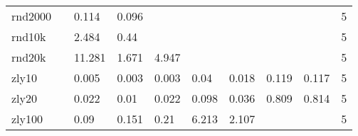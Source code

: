 \begin{landscape}
\begin{table}[h]
\begin{tabular}{llllllllll}
			rnd2000 &       & 0.114  & 0.096   &          &            &            &          &         & 5     \\
			rnd10k  &       & 2.484  & 0.44    &          &            &            &          &         & 5     \\
			rnd20k  &       & 11.281 & 1.671   & 4.947    &            &            &          &         & 5     \\
			zly10   &       & 0.005  & 0.003   & 0.003    & 0.04       & 0.018      & 0.119    & 0.117   & 5     \\
			zly20   &       & 0.022  & 0.01    & 0.022    & 0.098      & 0.036      & 0.809    & 0.814   & 5     \\
			zly100  &       & 0.09   & 0.151   & 0.21     & 6.213      & 2.107      &          &         & 5    
		\end{tabular}
	\end{table}
\end{landscape}
